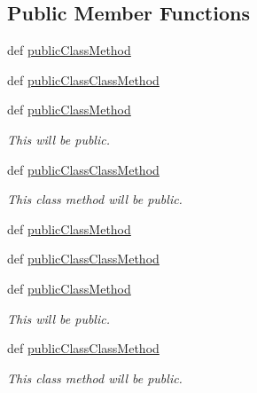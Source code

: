 \subsection*{Public Member Functions}
\begin{DoxyCompactItemize}
\item 
def \hyperlink{classdoxypypy_1_1test_1_1sample__privacy_1_1_new_style_sample_a5c1fadfe88ff7a836674a07f412131be}{public\-Class\-Method}
\item 
def \hyperlink{classdoxypypy_1_1test_1_1sample__privacy_1_1_new_style_sample_ae84bba2b288c8b35b90b8b187004273f}{public\-Class\-Class\-Method}
\item 
def \hyperlink{classdoxypypy_1_1test_1_1sample__privacy_1_1_new_style_sample_a5c1fadfe88ff7a836674a07f412131be}{public\-Class\-Method}
\begin{DoxyCompactList}\small\item\em This will be public. \end{DoxyCompactList}\item 
def \hyperlink{classdoxypypy_1_1test_1_1sample__privacy_1_1_new_style_sample_ae84bba2b288c8b35b90b8b187004273f}{public\-Class\-Class\-Method}
\begin{DoxyCompactList}\small\item\em This class method will be public. \end{DoxyCompactList}\item 
def \hyperlink{classdoxypypy_1_1test_1_1sample__privacy_1_1_new_style_sample_a5c1fadfe88ff7a836674a07f412131be}{public\-Class\-Method}
\item 
def \hyperlink{classdoxypypy_1_1test_1_1sample__privacy_1_1_new_style_sample_ae84bba2b288c8b35b90b8b187004273f}{public\-Class\-Class\-Method}
\item 
def \hyperlink{classdoxypypy_1_1test_1_1sample__privacy_1_1_new_style_sample_a5c1fadfe88ff7a836674a07f412131be}{public\-Class\-Method}
\begin{DoxyCompactList}\small\item\em This will be public. \end{DoxyCompactList}\item 
def \hyperlink{classdoxypypy_1_1test_1_1sample__privacy_1_1_new_style_sample_ae84bba2b288c8b35b90b8b187004273f}{public\-Class\-Class\-Method}
\begin{DoxyCompactList}\small\item\em This class method will be public. \end{DoxyCompactList}\item 

\end{DoxyCompactItemize}
